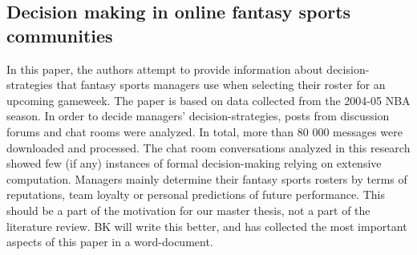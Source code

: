 \subsection{Decision making in online fantasy sports communities}
In this paper, the authors attempt to provide information about decision-strategies that fantasy sports managers use when selecting their roster for an upcoming gameweek. The paper is based on data collected from the 2004-05 NBA season. 
\newpar
In order to decide managers' decision-strategies, posts from discussion forums and chat rooms were analyzed. In total, more than 80 000 messages were downloaded and processed. The chat room conversations analyzed in this research showed few (if any) instances of formal decision-making relying on extensive computation. Managers mainly determine their fantasy sports rosters by terms of reputations, team loyalty or personal predictions of future performance. 
\newpar
This should be a part of the motivation for our master thesis, not a part of the literature review. BK will write this better, and has collected the most important aspects of this paper in a word-document. 


